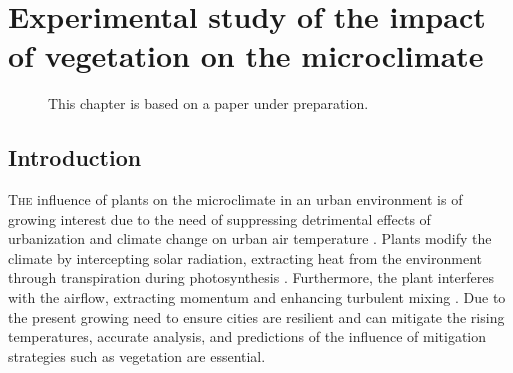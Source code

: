 \chapter{Experimental study of the impact of vegetation on the microclimate}
\label{ch:microclimatestudy}
\def\figdir{chapters/ch05_microclimatestudy/figures/}

\begin{figure}[h]
	\centering
	\begin{minipage}{0.9\textwidth}
		\textsf{ \footnotesize This chapter is based on a paper under preparation.}
	\end{minipage}
\end{figure}
\vspace{2em}

\section{Introduction}

\lettrine[lines=3,nindent=0em,loversize=0.1]{T}{he} influence of plants on the microclimate in an urban environment is of growing interest due to the need of suppressing detrimental effects of urbanization and climate change on urban air temperature \citep{Chen2006,Demuzere2014,Dimoudi2003,Matthews2017,Shashua-Bar2009b,Shashua-Bar2000a}. Plants modify the climate by intercepting solar radiation, extracting heat from the environment through transpiration during photosynthesis \citep{nobel2009physicochemical}. Furthermore, the plant interferes with the airflow, extracting momentum and enhancing turbulent mixing \citep{Finnigan2009, Gromke2014, Sanz2003}. Due to the present growing need to ensure cities are resilient and can mitigate the rising temperatures, accurate analysis, and predictions of the influence of mitigation strategies such as vegetation are essential. 

